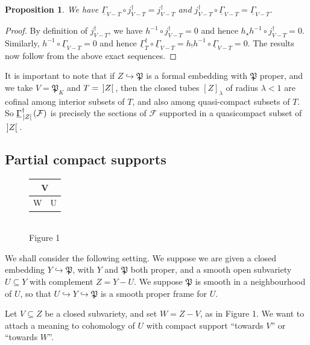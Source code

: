 \documentclass[cjm]{ipart}
\theoremstyle{plain}
\newtheorem{proposition}[theorem]{Proposition}
\theoremstyle{remark}
\DeclarePairedDelimiter{\tb}{{\,]}}{{[\, }} %
\newcommand{\cF}{\mathcal{F}}
\newcommand{\fP}{\mathfrak{P}}
\newcommand{\into}{\hookrightarrow}
\newcommand{\uGa}{\underline{\Gamma}}
\numberwithin{equation}{subsection}
\begin{document}
  \begin{proposition}
   \label{prop:supportfunctors}
   We have $\uGa_{V-T} \circ j^\dag_{V-T} = j^\dag_{V-T}$ and $j^\dag_{V-T} \circ \uGa_{V-T} =  \uGa_{V-T}$.
  \end{proposition}

  \begin{proof}
   By definition of $j^\dag_{V-T}$, we have $h^{-1} \circ j^\dag_{V-T} = 0$ and hence $h_\star h^{-1} \circ j^\dag_{V-T} = 0$. Similarly, $h^{-1} \circ \uGa_{V-T} = 0$ and hence $\uGa^\dag_T \circ \uGa_{V-T} = h_! h^{-1} \circ \uGa_{V-T} = 0$. The results now follow from the above exact sequences.
  \end{proof}


  It is important to note that if $Z \into \fP$ is a formal embedding with $\fP$ proper, and we take $V = \fP_K$ and $T =\tb{Z}$, then the closed tubes $[Z]_\lambda$ of radius $\lambda < 1$ are cofinal among interior subsets of $T$, and also among quasi-compact subsets of $T$. So $\uGa^\dag_{\tb{Z}}(\cF)$ is precisely the sections of $\cF$ supported in a quasicompact subset of $\tb{Z}$.

 \subsection{Partial compact supports}
  \label{sect:partialsupport}

  \begin{figure}
   \centering
   \begin{tabular}{|l|l|}
    \hline
    \multicolumn{2}{|c|}{V} \\ \hline
    W          & \hspace{1cm}\rule[-1cm]{0pt}{2cm} U  \hspace{1cm}  \\ \hline
   \end{tabular} \\[0.5ex]
   Figure 1
  \end{figure}
  We shall consider the following setting. We suppose we are given a closed embedding $Y \into \fP$, with $Y$ and $\fP$ both  proper, and a smooth open subvariety $U \subseteq Y$ with complement $Z = Y - U$. We suppose $\fP$ is smooth in a neighbourhood of $U$, so that $U \into Y \into \fP$ is a smooth proper frame for $U$.

  Let $V \subseteq Z$ be a closed subvariety, and set $W = Z - V$, as in Figure 1.  We want to attach a meaning to cohomology of $U$ with compact support ``towards $V$'' or ``towards $W$''.
\end{document}

